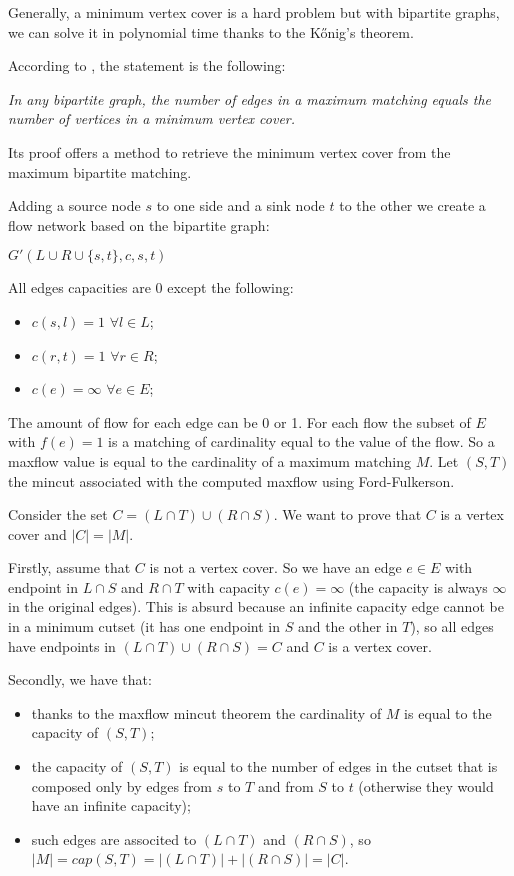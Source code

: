 \documentclass[paper=a4, fontsize=11pt]{scrartcl} %
\numberwithin{equation}{section} %
\numberwithin{figure}{section} %
\numberwithin{table}{section} %
\begin{document}
Generally, a minimum vertex cover is a hard problem but with bipartite graphs, we can solve it in polynomial time thanks to the Kőnig's theorem.

According to \cite{konig_wiki}, the statement is the following:

\bigskip
\textit{In any bipartite graph, the number of edges in a maximum matching equals the number of vertices in a minimum vertex cover.}
\bigskip

Its proof offers a method to retrieve the minimum vertex cover from the maximum bipartite matching.

Adding a source node $s$ to one side and a sink node $t$ to the other we create a flow network based on the bipartite graph:

$G'(L \cup R \cup \{s, t\}, c, s, t)$

All edges capacities are $0$ except the following:

\begin{itemize}
    \item $c(s, l) = 1$  $ \forall l \in L$;
    \item $c(r, t) = 1$  $ \forall r \in R$;
    \item $c(e) = \infty$  $ \forall e \in E$;
\end{itemize}

The amount of flow for each edge can be 0 or 1.
For each flow the subset of $E$ with $f(e) = 1$ is a matching of cardinality equal to the value of the flow.
So a maxflow value is equal to the cardinality of a maximum matching $M$.
Let $(S, T)$ the mincut associated with the computed maxflow using Ford-Fulkerson.

Consider the set $C = (L \cap T) \cup (R \cap S)$. We want to prove that $C$ is a vertex cover and $|C| = |M|$.

Firstly, assume that $C$ is not a vertex cover. So we have an edge $e \in E$ with endpoint in $L \cap S$ and $R \cap T$ with capacity $c(e) = \infty$ (the capacity is always $\infty$ in the original edges). This is absurd because an infinite capacity edge cannot be in a minimum cutset (it has one endpoint in $S$ and the other in $T$), so all edges have endpoints in $(L \cap T) \cup (R \cap S) = C$ and $C$ is a vertex cover.

Secondly, we have that:
\begin{itemize}
\item thanks to the maxflow mincut theorem the cardinality of $M$ is equal to the capacity of $(S, T)$;
\item the capacity of $(S, T)$ is equal to the number of edges in the cutset that is composed only by edges from $s$ to $T$ and from $S$ to $t$ (otherwise they would have an infinite capacity);
\item such edges are associted to $(L \cap T)$ and $(R \cap S)$, so $|M| = cap(S, T) = |(L \cap T)| + |(R \cap S)| = |C|$.
\end{itemize}
\end{document}
